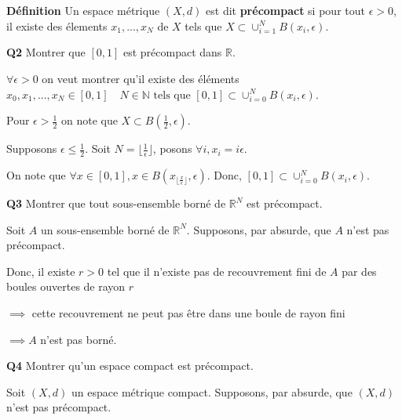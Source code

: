 \documentclass[french]{article}
\begin{document}
	 \newpage
	 
	 \begin{tcolorbox}[colback=yellow!5!white,colframe=yellow!75!black]
	 	\textbf{\large{Définition}} Un espace métrique $(X,d)$ est dit \textbf{précompact} si pour tout $\epsilon > 0$, il existe des élements $x_1, ..., x_N$ de $X$ tels que $X \subset \cup_{i=1}^{N} B(x_i, \epsilon)$.
	 \end{tcolorbox}
 
 	\begin{tcolorbox}[colback=gray!5!white,colframe=gray!75!black]
 		\textbf{\large{Q2}} Montrer que $[0,1]$ est précompact dans $\mathbb{R}$.
 	\end{tcolorbox}
 
	$\forall \epsilon > 0$ on veut montrer qu'il existe des éléments $ x_0, x_1, ..., x_N \in [0,1] \quad N \in \mathbb{N} \text{  tels que  } [0,1] \subset \cup_{i=0}^{N} B(x_i, \epsilon)$.
	
	Pour $\epsilon > \frac{1}{2}$ on note que $X \subset B(\frac{1}{2}, \epsilon)$.
	
	Supposons $\epsilon \leq \frac{1}{2}$. Soit $N = \lfloor \frac{1}{\epsilon} \rfloor$, posons $\forall i, x_i = i\epsilon$.
	
	On note que $\forall x \in [0, 1], x \in B( x_{\lfloor \frac{x}{\epsilon} \rfloor},\epsilon)$. Donc, $[0,1] \subset \cup_{i=0}^{N} B(x_i, \epsilon)$. 

 	\begin{tcolorbox}[colback=gray!5!white,colframe=gray!75!black]
 		\textbf{\large{Q3}} Montrer que tout sous-ensemble borné de $\mathbb{R}^N$ est précompact.
 	\end{tcolorbox}
 
 	Soit $A$ un sous-ensemble borné de $\mathbb{R}^N$. Supposons, par absurde, que $A$ n'est pas précompact.
 	
 	Donc, il existe $r>0$ tel que il n'existe pas de recouvrement fini de $A$ par des boules ouvertes de rayon $r$
 	
 	$\implies $ cette recouvrement ne peut pas être dans une boule de rayon fini
 	
 	$\implies A$ n'est pas borné.
	
 	\begin{tcolorbox}[colback=gray!5!white,colframe=gray!75!black]
 		\textbf{\large{Q4}} Montrer qu'un espace compact est précompact.
 	\end{tcolorbox}
 
 	Soit $(X,d)$ un espace métrique compact. Supposons, par absurde, que $(X,d)$ n'est pas précompact.
 	
\end{document}
